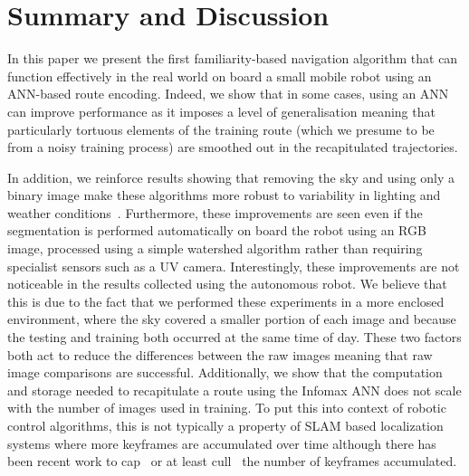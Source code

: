 \documentclass[letterpaper]{article}
\begin{document}
\section{Summary and Discussion}
In this paper we present the first familiarity-based navigation algorithm that can function effectively in the real world on board a small mobile robot using an ANN-based route encoding. 
Indeed, we show that in some cases, using an ANN can improve performance as it imposes a level of generalisation meaning that particularly tortuous elements of the training route (which we presume to be from a noisy training process) are smoothed out in the recapitulated trajectories.

In addition, we reinforce results showing that removing the sky and using only a binary image make these algorithms more robust to variability in lighting and weather conditions~\citep{Philippides2011,Stone2014}. 
Furthermore, these improvements are seen even if the segmentation is performed automatically on board the robot using an RGB image, processed using a simple watershed algorithm rather than requiring specialist sensors such as a UV camera.
Interestingly, these improvements are not noticeable in the results collected using the autonomous robot.
We believe that this is due to the fact that we performed these experiments in a more enclosed environment, where the sky covered a smaller portion of each image and because the testing and training both occurred at the same time of day.
These two factors both act to reduce the differences between the raw images meaning that raw image comparisons are successful.
Additionally, we show that the computation and storage needed to recapitulate a route using the Infomax ANN does not scale with the number of images used in training.
To put this into context of robotic control algorithms, this is not typically a property of SLAM based localization systems where more keyframes are accumulated over time although there has been recent work to cap~\citep{Maddern2012} or at least cull~\citep{Mur-Artal2015} the number of keyframes accumulated.
\end{document}
